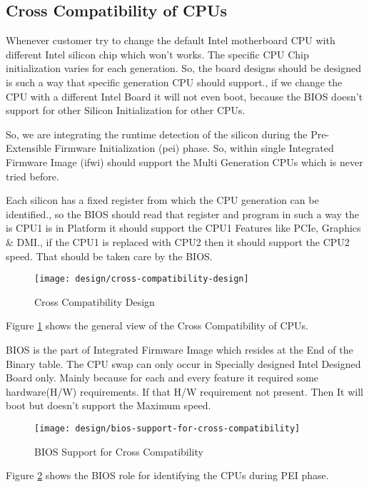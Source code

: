 \subsection{Cross Compatibility of CPUs}
Whenever customer try to change the default Intel motherboard CPU with different Intel silicon chip which won’t works. The specific CPU Chip initialization varies for each generation. So, the board designs should be designed is such a way that specific generation CPU should support., if we change the CPU with a different Intel Board it will not even boot, because the BIOS doesn't support for other Silicon Initialization for other CPUs.

So, we are integrating the runtime detection of the silicon during the Pre-Extensible Firmware Initialization (\gls{pei}) phase. So, within single Integrated Firmware Image (\gls{ifwi}) should support the Multi Generation CPUs which is never tried before.

Each silicon has a fixed register from which the CPU generation can be identified., so the BIOS should read that register and program in such a way the is CPU1 is in Platform it should support the CPU1 Features like PCIe, Graphics \& DMI., if the CPU1 is replaced with CPU2 then it should support the CPU2 speed. That should be taken care by the BIOS.

\begin{figure}[h]
	\centering
	\texttt{[image: design/cross-compatibility-design]}
	\caption{Cross Compatibility Design}\label{fig:design-cross-compatibility-design}
\end{figure}

Figure \ref{fig:design-cross-compatibility-design} shows the general view of the Cross Compatibility of CPUs.

BIOS is the part of Integrated Firmware Image which resides at the End of the Binary table. The CPU swap can only occur in Specially designed Intel Designed Board only. Mainly because for each and every feature it required some hardware(H/W) requirements. If that H/W requirement not present. Then It will boot but doesn't support the Maximum speed.


\begin{figure}[h]
	\centering
	\texttt{[image: design/bios-support-for-cross-compatibility]}
	\caption{BIOS Support for Cross Compatibility}\label{fig:design-bios-support-for-cross-compatibility}
\end{figure}

Figure \ref{fig:design-bios-support-for-cross-compatibility} shows the BIOS role for identifying the CPUs during PEI phase.

